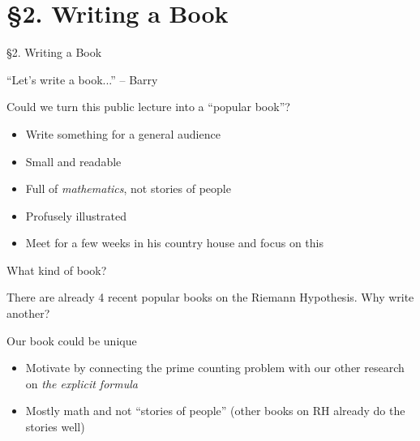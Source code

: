 \documentclass{beamer}
\newcommand{\mysection}[2]{\section{\S#1. #2}%
\begin{frame}{}
\vfill
\begin{center}
\hrulefill
\vfill
\Huge\sc \S#1. #2
\vfill
\hrulefill
\end{center}
\vfill
\end{frame}}
\begin{document}
\mysection{2}{Writing a Book}

\begin{frame}{``Let's write a book...'' -- Barry}
  \begin{block}{Could we turn this public lecture into a ``popular book''?}

    \begin{itemize}
      \item Write something for a general audience
      \item Small and readable
      \item Full of {\em mathematics}, not stories of people
      \item Profusely illustrated
      \item Meet for a few weeks in his country house and focus on this
    \end{itemize}
  \end{block}
\end{frame}


\begin{frame}{What kind of book?}

  There are already 4 recent popular books on the Riemann Hypothesis.  Why write another?
  \vfill

  \begin{block}{Our book could be unique}
    \begin{itemize}
      \item Motivate by connecting the prime counting problem with our other research on {\em the explicit formula}
      \item Mostly math and not ``stories of people'' (other books on RH already do the stories well)
    \end{itemize}
  \end{block}
\end{frame}
\end{document}

